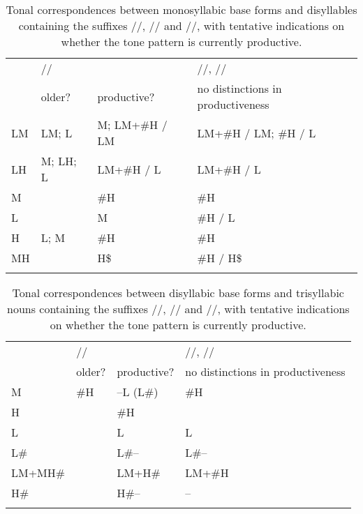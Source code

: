 	\begin{subtables}
		\label{tab:tcorrd}
		\begin{table}%
			\caption{\label{tab:tcorrmono}Tonal correspondences between {monosyllabic} base forms and disyllables containing the suffixes //,
				// and //, with tentative indications on whether the tone pattern is currently
				productive.}
						\begin{tabularx}{\textwidth}{ l l Q l }
				\lsptoprule
				&  & //, //\\\cmidrule(lr){2-3}\cmidrule(lr){4-4}
				& older? & productive? & no distinctions in productiveness\\ \midrule
				LM & LM; L & M; LM+\#H / LM & LM+\#H / LM; \#H / L\\
				LH & M; LH; L & LM+\#H / L & LM+\#H / L\\
				M &  & \#H & \#H\\
				L &  & M & \#H / L\\
				H & L; M & \#H & \#H\\
				MH &  & H\$ & \#H / H\$\\
				\lspbottomrule
			\end{tabularx}
		\end{table}
		
		\begin{table}%
			\caption{\label{tab:tcorrdi}Tonal correspondences between disyllabic base forms and {trisyllabic} nouns containing the suffixes //, // and //, with tentative indications on whether the tone pattern is currently productive.}
			\begin{tabularx}{\textwidth}{ l l Q l }
				\lsptoprule
				&  & //, //\\\cmidrule(lr){2-3}\cmidrule(lr){4-4}
				& older? & productive? & no distinctions in productiveness\\ \midrule
				M & \#H & --L (L\#) & \#H\\
				H &  & \#H &\\
				L &  & L & L\\
				L\# &  & L\#-- & L\#--\\
				LM+MH\# &  & LM+H\# & LM+\#H\\
				H\# &  & H\#-- & --\\
				\lspbottomrule
			\end{tabularx}
		\end{table}
	\end{subtables}

